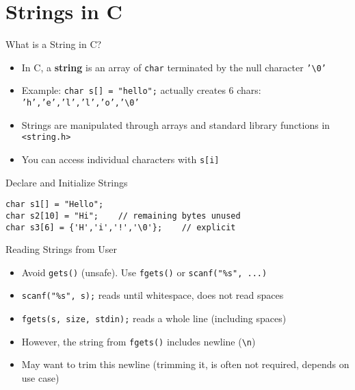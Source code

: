 \documentclass[12pt, aspectratio=169]{beamer}
\begin{document}
    \section{Strings in C}

    \begin{frame}{What is a String in C?}
        \begin{itemize}
            \item In C, a \textbf{string} is an array of \texttt{char} terminated by the null character \texttt{'\textbackslash0'}
            \item Example: \texttt{char s[] = "hello";} actually creates 6 chars: \texttt{'h','e','l','l','o','\textbackslash0'}
            \item Strings are manipulated through arrays and standard library functions in \texttt{<string.h>}
            \item You can access individual characters with \texttt{s[i]}
        \end{itemize}
    \end{frame}


    \begin{frame}[fragile]{Declare and Initialize Strings}
        \begin{verbatim}
char s1[] = "Hello";
char s2[10] = "Hi";    // remaining bytes unused
char s3[6] = {'H','i','!','\0'};    // explicit
        \end{verbatim}
    \end{frame}


    \begin{frame}[fragile]{Reading Strings from User}
        \begin{itemize}
            \item Avoid \texttt{gets()} (unsafe). Use \texttt{fgets()} or \texttt{scanf("\%s", ...)}
            \item \texttt{scanf("\%s", s);} reads until whitespace, does not read spaces
            \item \texttt{fgets(s, size, stdin);} reads a whole line (including spaces)
            \item However, the string from \texttt{fgets()} includes newline (\verb|\n|)
            \item May want to trim this newline (trimming it, is often not required, depends on use case)
        \end{itemize}
    \end{frame}
\end{document}

